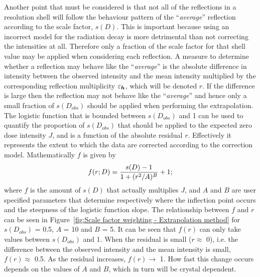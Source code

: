 Another point that must be considered is that not all of the reflections in a resolution shell will follow the behaviour pattern of the ``\textit{average}'' reflection according to the scale factor, $s(D)$.
This is important because using an incorrect model for the radiation decay is more detrimental than not correcting the intensities at all.
Therefore only a fraction of the scale factor for that shell value may be applied when considering each reflection.
A measure to determine whether a reflection may behave like the ``\textit{average}'' is the absolute difference in intensity between the observed intensity and the mean intensity multiplied by the corresponding reflection multiplicity $\varepsilon_{\boldsymbol{h}}$, which will be denoted $r$.
If the difference is large then the reflection may not behave like the ``\textit{average}'' and hence only a small fraction of $s(D_{obs})$ should be applied when performing the extrapolation.
The logistic function that is bounded between $s(D_{obs})$ and 1 can be used to quantify the proportion of $s(D_{obs})$ that should be applied to the expected zero dose intensity $J$, and is a function of the absolute residual $r$.
Effectively it represents the extent to which the data are corrected according to the correction model.
Mathematically $f$ is given by
\begin{equation}
f(r; D) = \frac{s(D) - 1}{1 + (r^2/A)^B} + 1;
\label{eq:Fraction of scale factor to be applied - Extrapolation method}
\end{equation}
where $f$ is the amount of $s(D)$ that actually multiplies $J$, and $A$ and $B$ are user specified parameters that determine respectively where the inflection point occurs and the steepness of the logistic function slope.
The relationship between $f$ and $r$ can be seen in Figure~\ref{fig:Scale factor weighting - Extrapolation method} for $s(D_{obs})$ = 0.5, $A$ = 10 and $B$ = 5.
It can be seen that $f(r)$ can only take values between $s(D_{obs})$ and 1.
When the residual is small ($r \approx$ 0), i.e. the difference between the observed intensity and the mean intensity is small, $f(r) \approx$ 0.5.
As the residual increases, $f(r) \rightarrow$ 1.
How fast this change occurs depends on the values of $A$ and $B$, which in turn will be crystal dependent.
